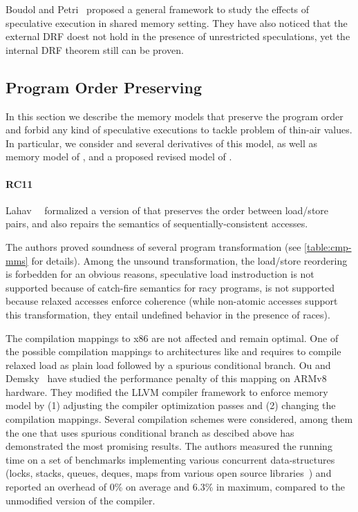 Boudol and Petri~\cite{Boudol-Petri:ESOP10} proposed a general 
framework to study the effects of speculative execution in
shared memory setting. 
They have also noticed that the external DRF doest not 
hold in the presence of unrestricted speculations, 
yet the internal DRF theorem still can be proven. 

\subsection{Program Order Preserving}
\label{sec:catalog:porf}

In this section we describe the memory models 
that preserve the program order and forbid any 
kind of speculative executions to tackle problem 
of thin-air values. 
In particular, we consider \RCMM and 
several derivatives of this model, 
as well as memory model of \OCaml, 
and a proposed revised model of \Java.  

\paragraph{RC11}

Lahav~\etal~\cite{Lahav-al:PLDI17} formalized 
a version of \CMM that preserves the order between load/store pairs, 
and also repairs the semantics of sequentially-consistent accesses.

The authors proved soundness of several program transformation 
(see \cref{table:cmp-mms} for details). 
Among the unsound transformation, 
the load/store reordering is forbedden for an obvious reasons, 
speculative load instroduction is not supported 
because of catch-fire semantics for racy programs, 
\CSE is not supported because relaxed accesses 
enforce coherence (while non-atomic accesses 
support this transformation, they entail 
undefined behavior in the presence of races).

The compilation mappings to x86 are not affected and remain optimal.
One of the possible compilation mappings 
to architectures like \ARM and \POWER 
requires to compile relaxed load as  
plain load followed by a spurious conditional branch.
Ou and Demsky~\cite{Ou-Demsky:OOPSLA18} have studied 
the performance penalty of this mapping on ARMv8 hardware.
They modified the LLVM compiler framework 
to enforce \RCMM memory model
by (1) adjusting the compiler optimization passes and 
(2) changing the compilation mappings.
Several compilation schemes were considered,
among them the one that uses spurious conditional branch
as descibed above has demonstrated the most promising results.  
The authors measured the running time on a set of benchmarks 
implementing various concurrent data-structures
(\eg locks, stacks, queues, deques, maps
from various open source libraries~\cite{CDSLib, FollyLib, JunctionLib})
and reported an overhead of 0\% on average and 6.3\% in maximum,
compared to the unmodified version of the compiler. 

